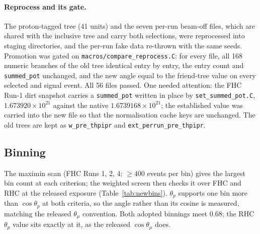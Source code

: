 \paragraph{Reprocess and its gate.} The proton-tagged tree (41 units) and the seven per-run beam-off
files, which are shared with the inclusive tree and carry both selections, were reprocessed into
staging directories, and the per-run fake data re-thrown with the same seeds. Promotion was gated on
\texttt{macros/compare\_reprocess.C}: for every file, all 168 numeric branches of the old tree
identical entry by entry, the entry count and \texttt{summed\_pot} unchanged, and the new angle equal
to the friend-tree value on every selected and signal event. All 56 files passed. One needed
attention: the FHC Run-1 dirt snapshot carries a \texttt{summed\_pot} written in place by
\texttt{set\_summed\_pot.C}, $1.673920\times10^{21}$ against the native $1.6739168\times10^{21}$; the
established value was carried into the new file so that the normalisation cache keys are unchanged.
The old trees are kept as \texttt{w\_pre\_thpipr} and \texttt{ext\_perrun\_pre\_thpipr}.

\subsection{Binning}

The maximin scan (FHC Runs 1, 2, 4; $\geq400$ events per bin) gives the largest bin count at each
criterion; the weighted screen then checks it over FHC and RHC at the released exposure
(Table~\ref{tab:newbins}). $\theta_p$ supports one bin more than $\cos\theta_p$ at both criteria, so
the angle rather than its cosine is measured, matching the released $\theta_\mu$ convention. Both
adopted binnings meet $0.68$; the RHC $\theta_p$ value sits exactly at it, as the released
$\cos\theta_\mu$ does.

